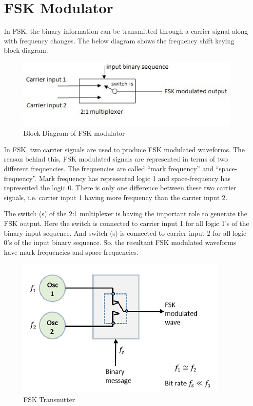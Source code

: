 \documentclass{report}
\begin{document}
	\section{FSK Modulator}{
		\bigskip
		In FSK, the binary information can be transmitted through a carrier signal along with frequency changes. The below diagram shows the frequency shift keying block diagram.\bigskip
		
		\begin{figure}[H]
			\centering
			\includegraphics{images/fsk_bd.jpg}
			\caption{Block Diagram of FSK modulator}
			\label{fig:}
		\end{figure}
		
		In FSK, two carrier signals are used to produce FSK modulated waveforms. The reason behind this, FSK modulated signals are represented in terms of two different frequencies. The frequencies are called “mark frequency” and “space-frequency”. Mark frequency has represented logic 1 and space-frequency has represented the logic 0. There is only one difference between these two carrier signals, i.e. carrier input 1 having more frequency than the carrier input 2.\bigskip 
		
		The switch (s) of the 2:1 multiplexer is having the important role to generate the FSK output. Here the switch is connected to carrier input 1 for all logic 1’s of the binary input sequence. And switch (s) is connected to carrier input 2 for all logic 0’s of the input binary sequence. So, the resultant FSK modulated waveforms have mark frequencies and space frequencies.\bigskip 
		
			
		\begin{figure}[H]
			\centering
			\includegraphics{images/fsk_transmitter.jpg}
			\caption{FSK Transmitter}
			\label{fig:}
		\end{figure}	
		
		
		\bigskip
	}
\newpage
\end{document}
